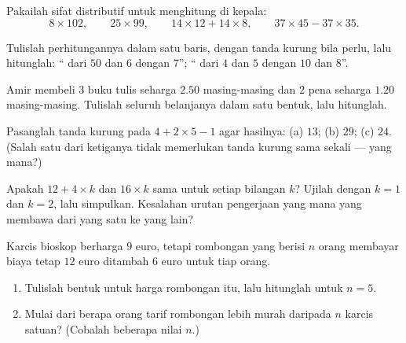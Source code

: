 \begin{exercise}[$\star$]\label{exo:g7:priorities:5}
Pakailah sifat distributif untuk menghitung di kepala:
\[
8 \times 102, \qquad
25 \times 99, \qquad
14 \times 12 + 14 \times 8, \qquad
37 \times 45 - 37 \times 35 .
\]
\end{exercise}

\begin{exercise}[$\star$]\label{exo:g7:priorities:6}
Tulislah perhitungannya dalam satu baris, dengan tanda kurung bila
perlu, lalu hitunglah: `` dari $50$ dan  $6$ dengan
$7$''; `` dari  $4$ dan $5$ dengan  $10$ dan
$8$''.
\end{exercise}

\begin{exercise}[$\star$]\label{exo:g7:priorities:7}
Amir membeli $3$ buku tulis seharga $2.50$ masing-masing dan $2$ pena
seharga $1.20$ masing-masing. Tulislah seluruh belanjanya dalam satu
bentuk, lalu hitunglah.
\end{exercise}

\begin{exercise}[$\star\star$]\label{exo:g7:priorities:8}
Pasanglah tanda kurung pada $4 + 2 \times 5 - 1$ agar hasilnya: (a)
$13$; (b) $29$; (c) $24$. (Salah satu dari ketiganya tidak memerlukan
tanda kurung sama sekali --- yang mana?)
\end{exercise}

\begin{exercise}[$\star\star$]\label{exo:g7:priorities:9}
Apakah $12 + 4 \times k$ dan $16 \times k$ sama untuk setiap bilangan
$k$? Ujilah dengan $k = 1$ dan $k = 2$, lalu simpulkan. Kesalahan
urutan pengerjaan yang mana yang membawa dari yang satu ke yang lain?
\end{exercise}

\begin{exercise}[$\star\star$]\label{exo:g7:priorities:10}
Karcis bioskop berharga $9$ euro, tetapi rombongan yang berisi $n$
orang membayar biaya tetap $12$ euro ditambah $6$ euro untuk tiap
orang.
\begin{enumerate}
  \item Tulislah bentuk untuk harga rombongan itu, lalu hitunglah
        untuk $n = 5$.
  \item Mulai dari berapa orang tarif rombongan lebih murah daripada
        $n$ karcis satuan? (Cobalah beberapa nilai $n$.)
\end{enumerate}
\end{exercise}

